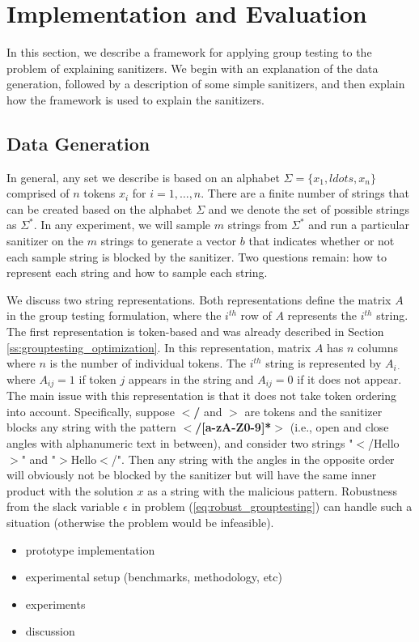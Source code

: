\section{Implementation and Evaluation}
In this section, we describe a framework for applying group testing to the problem of explaining sanitizers. We begin with an explanation of the data generation, followed by a description of some simple sanitizers, and then explain how the framework is used to explain the sanitizers.

\subsection{Data Generation}
In general, any set we describe is based on an alphabet $\Sigma=\{x_1,ldots,x_n\}$ comprised of $n$ tokens $x_i$ for $i=1,\ldots,n$. There are a finite number of strings that can be created based on the alphabet $\Sigma$ and we denote the set of possible strings as $\Sigma^*$. In any experiment, we will sample $m$ strings from $\Sigma^*$ and run a particular sanitizer on the $m$ strings to generate a vector $b$ that indicates whether or not each sample string is blocked by the sanitizer. Two questions remain: how to represent each string and how to sample each string. 

We discuss two string representations. Both representations define the matrix $A$ in the group testing formulation, where the $i^{th}$ row of $A$ represents the $i^{th}$ string. The first representation is token-based and was already described in Section \ref{ss:grouptesting_optimization}. In this representation, matrix $A$ has $n$ columns where $n$ is the number of individual tokens. The $i^{th}$ string is represented by $A_{i\cdot}$ where $A_{ij}=1$ if token $j$ appears in the string and $A_{ij}=0$ if it does not appear. The main issue with this representation is that it does not take token ordering into account. Specifically, suppose \textbf{$<$/} and \textbf{$>$} are tokens and the sanitizer blocks any string with the pattern \textbf{$<$/[a-zA-Z0-9]*$>$} (i.e., open and close angles with alphanumeric text in between), and consider two strings "$<$/Hello$>$" and "$>$Hello$<$/". Then any string with the angles in the opposite order will obviously not be blocked by the sanitizer but will have the same inner product with the solution $x$ as a string with the malicious pattern. Robustness from the slack variable $\epsilon$ in problem (\ref{eq:robust_grouptesting}) can handle such a situation (otherwise the problem would be infeasible).  



\begin{itemize}
	\item prototype implementation
	\item experimental setup (benchmarks, methodology, etc)
	\item experiments
	\item discussion
\end{itemize}